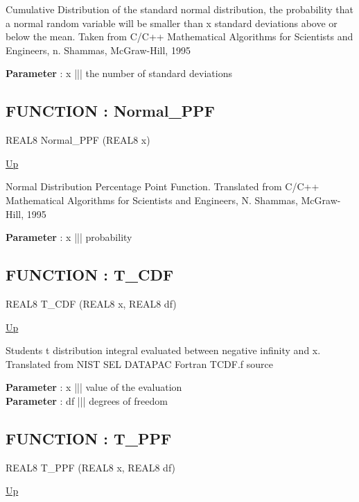 \par
Cumulative Distribution of the standard normal distribution, the probability that a normal random variable will be smaller than x standard deviations above or below the mean. Taken from C/C++ Mathematical Algorithms for Scientists and Engineers, n. Shammas, McGraw-Hill, 1995
\par
\textbf{Parameter} : x ||| the number of standard deviations \\
\subsection*{FUNCTION : Normal\_PPF}
\hypertarget{ecldoc:ml_core.math.distributions.normal_ppf}{}
\begin{minipage}[t]{\textwidth}
\begin{flushleft}
REAL8 Normal\_PPF (REAL8 x)
\end{flushleft}
\end{minipage}
\hyperlink{ecldoc:ML_Core.Math.Distributions}{Up}

\par
Normal Distribution Percentage Point Function. Translated from C/C++ Mathematical Algorithms for Scientists and Engineers, N. Shammas, McGraw-Hill, 1995
\par
\textbf{Parameter} : x ||| probability \\
\subsection*{FUNCTION : T\_CDF}
\hypertarget{ecldoc:ml_core.math.distributions.t_cdf}{}
\begin{minipage}[t]{\textwidth}
\begin{flushleft}
REAL8 T\_CDF (REAL8 x, REAL8 df)
\end{flushleft}
\end{minipage}
\hyperlink{ecldoc:ML_Core.Math.Distributions}{Up}

\par
Students t distribution integral evaluated between negative infinity and x. Translated from NIST SEL DATAPAC Fortran TCDF.f source
\par
\textbf{Parameter} : x ||| value of the evaluation \\
\textbf{Parameter} : df ||| degrees of freedom \\
\subsection*{FUNCTION : T\_PPF}
\hypertarget{ecldoc:ml_core.math.distributions.t_ppf}{}
\begin{minipage}[t]{\textwidth}
\begin{flushleft}
REAL8 T\_PPF (REAL8 x, REAL8 df)
\end{flushleft}
\end{minipage}
\hyperlink{ecldoc:ML_Core.Math.Distributions}{Up}

